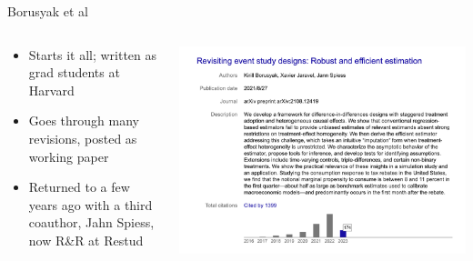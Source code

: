 \documentclass{beamer}
\begin{document}
\begin{frame}{Borusyak et al}
  \begin{columns}
    \begin{column}{0.5\textwidth}
      \begin{itemize}
\item Starts it all; written as grad students at Harvard
\item Goes through many revisions, posted as working paper
\item Returned to a few years ago with a third coauthor, Jahn Spiess, now R\&R at Restud
      \end{itemize}
    \end{column}
    \begin{column}{0.5\textwidth}
      \includegraphics[scale=0.25]{./lecture_includes/kirill_cites}
    \end{column}
  \end{columns}
\end{frame}
\end{document}
